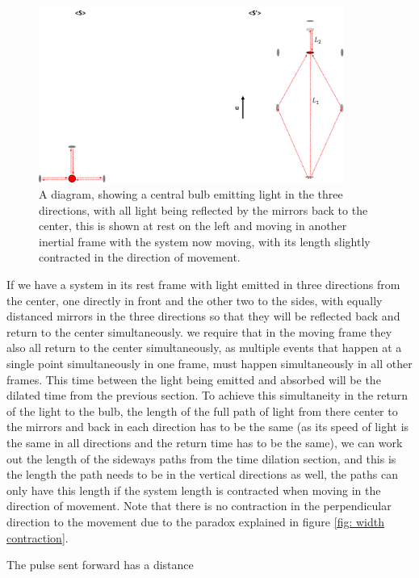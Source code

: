 \begin{figure}[H]
	\centering
	\includegraphics[width=10cm]{images/pdf/Length_Contraction.pdf}
	\caption{A diagram, showing a central bulb emitting light in the three directions, with all light being reflected by the mirrors back to the center, this is shown at rest on the left and moving in another inertial frame with the system now moving, with its length slightly contracted in the direction of movement.}
	\label{fig: length contraction math}
\end{figure}

If we have a system in its rest frame with light emitted in three directions from the center, one directly in front and the other two to the sides, with equally distanced mirrors in the three directions so that they will be reflected back and return to the center simultaneously. we require that in the moving frame they also all return to the center simultaneously, as multiple events that happen at a single point simultaneously in one frame, must happen simultaneously in all other frames. This time between the light being emitted and absorbed will be the dilated time from the previous section. To achieve this simultaneity in the return of the light to the bulb, the length of the full path of light from there center to the mirrors and back in each direction has to be the same (as its speed of light is the same in all directions and the return time has to be the same), we can work out the length of the sideways paths from the time dilation section, and this is the length the path needs to be in the vertical directions as well, the paths can only have this length if the system length is contracted when moving in the direction of movement. Note that there is no contraction in the perpendicular direction to the movement due to the paradox explained in figure \ref{fig: width contraction}.

The pulse sent forward has a distance


